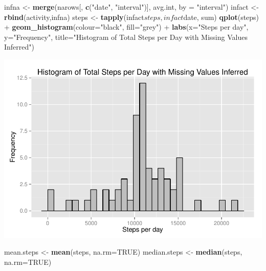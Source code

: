 \documentclass[]{article}
\newenvironment{Shaded}{\begin{snugshade}}{\end{snugshade}}
\newcommand{\KeywordTok}[1]{\textcolor[rgb]{0.13,0.29,0.53}{\textbf{{#1}}}}
\newcommand{\DataTypeTok}[1]{\textcolor[rgb]{0.13,0.29,0.53}{{#1}}}
\newcommand{\StringTok}[1]{\textcolor[rgb]{0.31,0.60,0.02}{{#1}}}
\newcommand{\OtherTok}[1]{\textcolor[rgb]{0.56,0.35,0.01}{{#1}}}
\newcommand{\NormalTok}[1]{{#1}}
\begin{document}
\begin{Shaded}
\begin{Highlighting}[]
\NormalTok{infna <-}\StringTok{ }\KeywordTok{merge}\NormalTok{(narows[, }\KeywordTok{c}\NormalTok{(}\StringTok{"date"}\NormalTok{, }\StringTok{"interval"}\NormalTok{)], avg.int, }\DataTypeTok{by =} \StringTok{"interval"}\NormalTok{)}
\NormalTok{infact <-}\StringTok{ }\KeywordTok{rbind}\NormalTok{(activity,infna)}
\NormalTok{steps <-}\StringTok{ }\KeywordTok{tapply}\NormalTok{(infact$steps, infact$date, sum)}
\KeywordTok{qplot}\NormalTok{(steps) +}\StringTok{ }\KeywordTok{geom_histogram}\NormalTok{(}\DataTypeTok{colour=}\StringTok{"black"}\NormalTok{, }\DataTypeTok{fill=}\StringTok{"grey"}\NormalTok{) +}\StringTok{ }
\StringTok{  }\KeywordTok{labs}\NormalTok{(}\DataTypeTok{x=}\StringTok{"Steps per day"}\NormalTok{, }\DataTypeTok{y=}\StringTok{"Frequency"}\NormalTok{, }\DataTypeTok{title=}\StringTok{"Histogram of Total Steps per Day with Missing Values Inferred"}\NormalTok{)}
\end{Highlighting}
\end{Shaded}

\includegraphics{PA1_template_files/figure-latex/unnamed-chunk-7-1.pdf}

\begin{Shaded}
\begin{Highlighting}[]
\NormalTok{mean.steps <-}\StringTok{ }\KeywordTok{mean}\NormalTok{(steps, }\DataTypeTok{na.rm=}\OtherTok{TRUE}\NormalTok{)}
\NormalTok{median.steps <-}\StringTok{ }\KeywordTok{median}\NormalTok{(steps, }\DataTypeTok{na.rm=}\OtherTok{TRUE}\NormalTok{)}
\end{Highlighting}
\end{Shaded}
\end{document}
